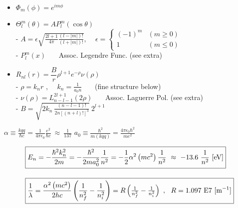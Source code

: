 \documentclass[12pt]{article}
\begin{document}
\noindent
\begin{minipage}[t]{.47\textwidth}
    \begin{itemize}
        \item \( \Phi_m(\phi) = e^{i m \phi}\)
        \item \( \Theta^m_l(\theta) = A P^m_l(\cos{\theta}) \)\\[5pt]
        - \( A = \epsilon \sqrt{ \frac{2l+1}{4\pi} \frac{(l-|m|)!}{(l+|m|)!} } \), \ \
            \( \epsilon = \begin{cases}
                \scriptstyle (-1)^m & \scriptstyle (m \geq 0) \\
                \scriptstyle1       & \scriptstyle (m \leq 0)
            \end{cases} \)\\[5pt]
        - \( P^m_l(x) \) \ \ \ {\scriptsize{Assoc. Legendre Func. (see extra)}}
    \end{itemize}   
\end{minipage}
\begin{minipage}[t]{.52\textwidth}
    \begin{itemize}
        \item \( R_{nl}(r) = \dfrac{B}{r} \rho^{l+1} e^{-\rho} \nu(\rho) \)\\[5pt]
        - \( \rho = k_n r \) , \ \ \( k_n = \frac{1}{a_0 n} \) 
            \ \ \ {\scriptsize(fine structure below)} \\[10pt]
        - \( \nu(\rho) = L^{2l+1}_{n-l-1}(2\rho) \) 
            \ \ \ {\scriptsize{Assoc. Laguerre Pol. (see extra)}} \\[10pt]
        - \( B = \sqrt{2 k_n \ \frac{ ( n-l-1 )! }{ 2n [ (n+l)! ]^3 }} \ 2^{l+1} \) 
    \end{itemize}     
\end{minipage}

\vspace{25pt} \noindent
\( \boxed{ \alpha \equiv \frac{kqq}{\hbar c} 
    = \frac{1}{4 \pi \epsilon_0} \frac{e^2}{\hbar c} \ \approx \ \frac{1}{137} } \)
\hspace{1cm}
\( \boxed{ a_0 \equiv \frac{\hbar^2}{m (kqq)} = \frac{4 \pi \epsilon_0 \hbar^2}{m e^2} } \)

\begin{align*}
    \Aboxed{ &E_n = - \frac{\hbar^2 k_n^2}{2m} = - \frac{\hbar^2}{2m a_0^2} \frac{1}{n^2}
        = - \frac{1}{2} \alpha^2 \left( m c^2 \right) \dfrac{1}{n^2}
        \ \approx \ -13.6 \ \dfrac{1}{n^2} \ [\text{eV}] }\\[10pt]
    \Aboxed{ &\frac{1}{\lambda} = \frac{\alpha^2 \left( m c^2 \right) }{2 h c}
        \left( \dfrac{1}{n_f^2} - \dfrac{1}{n_i^2} \right)
        = R \left( \tfrac{1}{n_f^2} - \tfrac{1}{n_i^2} \right) 
        \ , \ \ R = 1.097 \ \text{E} 7 \ [\text{m}^{-1}] }
\end{align*}
\end{document}
